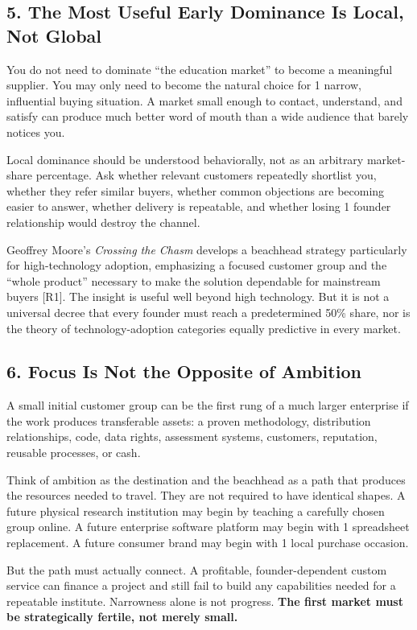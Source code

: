 \subsection*{5. The Most Useful Early Dominance Is Local, Not Global}

You do not need to dominate ``the education market'' to become a meaningful supplier. You may only need to become the natural choice for 1 narrow, influential buying situation. A market small enough to contact, understand, and satisfy can produce much better word of mouth than a wide audience that barely notices you.

Local dominance should be understood behaviorally, not as an arbitrary market-share percentage. Ask whether relevant customers repeatedly shortlist you, whether they refer similar buyers, whether common objections are becoming easier to answer, whether delivery is repeatable, and whether losing 1 founder relationship would destroy the channel.

Geoffrey Moore's \emph{Crossing the Chasm} develops a beachhead strategy particularly for high-technology adoption, emphasizing a focused customer group and the ``whole product'' necessary to make the solution dependable for mainstream buyers [R1]. The insight is useful well beyond high technology. But it is not a universal decree that every founder must reach a predetermined 50\% share, nor is the theory of technology-adoption categories equally predictive in every market.

\subsection*{6. Focus Is Not the Opposite of Ambition}

A small initial customer group can be the first rung of a much larger enterprise if the work produces transferable assets: a proven methodology, distribution relationships, code, data rights, assessment systems, customers, reputation, reusable processes, or cash.

Think of ambition as the destination and the beachhead as a path that produces the resources needed to travel. They are not required to have identical shapes. A future physical research institution may begin by teaching a carefully chosen group online. A future enterprise software platform may begin with 1 spreadsheet replacement. A future consumer brand may begin with 1 local purchase occasion.

But the path must actually connect. A profitable, founder-dependent custom service can finance a project and still fail to build any capabilities needed for a repeatable institute. Narrowness alone is not progress. \textbf{The first market must be strategically fertile, not merely small.}
